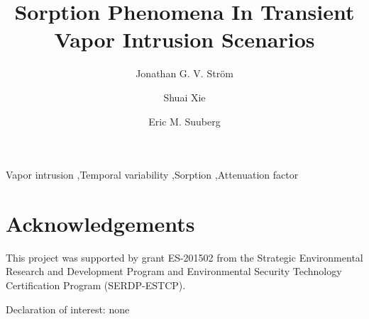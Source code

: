 \documentclass[preprint,12pt]{elsarticle}
\begin{document}
\begin{frontmatter}
\title{Sorption Phenomena In Transient Vapor Intrusion Scenarios}

\author[Brown]{Jonathan G. V. Ström}
\author[Brown]{Shuai Xie}
\author[Brown]{Eric M. Suuberg}


\address{These authors contributed equally to this work}
\address[Brown]{Brown University, School of Engineering, Providence, RI, USA}

\begin{abstract}

\end{abstract}

\begin{keyword}
  Vapor intrusion \sep Temporal variability \sep Sorption \sep Attenuation factor
\end{keyword}

\end{frontmatter}






\section*{Acknowledgements}
This project was supported by grant ES-201502 from the Strategic Environmental Research and Development Program and Environmental Security Technology Certification Program (SERDP-ESTCP).\par

Declaration of interest: none

\clearpage






\begin{comment}
Main point of this paper:

To explore how sorption affects VI transport in soils and indoor environment,
and the effect that sorption has on efficacy of mitigation systems

Outline:

Introduction:
* Why study sorption in VI?
- Many materials (significantly) sorb VI contaminants.
- No previous studies.
- May significantly affect:
-- Mitigation
-- VI investigations

* What are we gonna do to bridge till gap?
- Measure sorptive capacities at relevant concentrations. Why?
-- Isotherms non-linear w.r.t. concentration & few studies at VI relevant conditions.
-- Pick TCE (contaminant of significant concern).
- Apply results in our VI model.
-- Used extensively before
-- In lieu of a study house this will give some insights

* Outline
- Experimental setup
- Numerical model & governing equations
- Results regarding:
-- Soil transport & sorption
-- Indoor environment transport & sorption (specifically how response of c_in w.r.t. pressurization changes).
-- Reduction of mitigation system efficacy




\end{comment}
\end{document}
